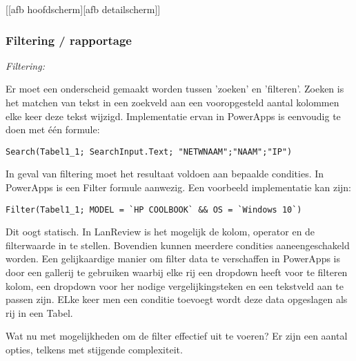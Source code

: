 [[afb hoofdscherm][afb detailscherm]] %

\subsubsection{Filtering / rapportage}

\textit{Filtering:}

Er moet een onderscheid gemaakt worden tussen 'zoeken' en 'filteren'. Zoeken is het matchen van tekst in een zoekveld aan een vooropgesteld aantal kolommen elke keer deze tekst wijzigd. Implementatie ervan in PowerApps is eenvoudig te doen met één formule:

\begin{lstlisting}
Search(Tabel1_1; SearchInput.Text; "NETWNAAM";"NAAM";"IP")
\end{lstlisting}

In geval van filtering moet het resultaat voldoen aan bepaalde condities. In PowerApps is een Filter formule aanwezig. Een voorbeeld implementatie kan zijn:

\begin{lstlisting}
Filter(Tabel1_1; MODEL = `HP COOLBOOK` && OS = `Windows 10`)
\end{lstlisting}

Dit oogt statisch. In LanReview is het mogelijk de kolom, operator en de filterwaarde in te stellen. Bovendien kunnen meerdere condities aaneengeschakeld worden.
Een gelijkaardige manier om filter data te verschaffen in PowerApps is door een gallerij te gebruiken waarbij elke rij een dropdown heeft voor te filteren kolom, een dropdown voor her nodige vergelijkingsteken en een tekstveld aan te passen zijn. ELke keer men een conditie toevoegt wordt deze data opgeslagen als rij in een Tabel.


Wat nu met mogelijkheden om de filter effectief uit te voeren? Er zijn een aantal opties, telkens met stijgende complexiteit.


